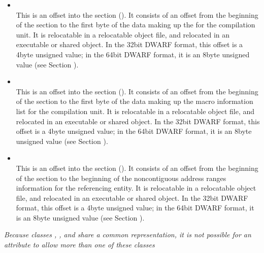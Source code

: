 \begin{itemize}
\item {} \\
This is an offset into the 
section
(). 
It consists of an offset from the
beginning of the 
section to the first byte of
the data making up the 
 for the compilation
unit. 
It is relocatable in a relocatable object file, and
relocated in an executable or shared object. In the 32\dash bit
DWARF format, this offset is a 4\dash byte unsigned value;
in the 64\dash bit DWARF format, it is an 8\dash byte unsigned value
(see Section ).


\item {} \\
This is an 
offset into the 
 section
(). It consists of an offset from the
beginning of the  
section to the first byte of
the data making up the macro information list for the compilation
unit. 
It is relocatable in a relocatable object file, and
relocated in an executable or shared object. In the 32\dash bit
DWARF format, this offset is a 4\dash byte unsigned value;
in the 64\dash bit DWARF format, it is an 8\dash byte unsigned value
(see Section ).

\item {} \\
This is an 
offset into the  section
(). 
It consists of an
offset from the beginning of the 
 section
to the beginning of the non\dash contiguous address ranges
information for the referencing entity.  
It is relocatable in
a relocatable object file, and relocated in an executable or
shared object. In the 32\dash bit DWARF format, this offset
is a 4\dash byte unsigned value; in the 64\dash bit DWARF
format, it is an 8\dash byte unsigned value (see Section
).
\end{itemize}

\textit{Because classes , 
, 
 and 
share a common representation, it is not possible for an
attribute to allow more than one of these classes}



